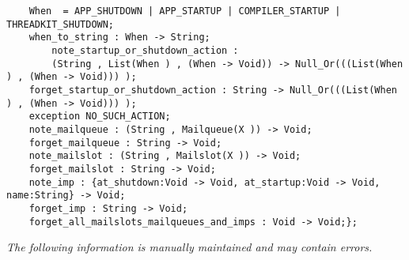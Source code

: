 \begin{verbatim}
    When  = APP_SHUTDOWN | APP_STARTUP | COMPILER_STARTUP | THREADKIT_SHUTDOWN;
    when_to_string : When -> String;
        note_startup_or_shutdown_action :
        (String , List(When ) , (When -> Void)) -> Null_Or(((List(When ) , (When -> Void))) );
    forget_startup_or_shutdown_action : String -> Null_Or(((List(When ) , (When -> Void))) );
    exception NO_SUCH_ACTION;
    note_mailqueue : (String , Mailqueue(X )) -> Void;
    forget_mailqueue : String -> Void;
    note_mailslot : (String , Mailslot(X )) -> Void;
    forget_mailslot : String -> Void;
    note_imp : {at_shutdown:Void -> Void, at_startup:Void -> Void, name:String} -> Void;
    forget_imp : String -> Void;
    forget_all_mailslots_mailqueues_and_imps : Void -> Void;};
\end{verbatim}
{\tiny\it The following information is manually maintained and may contain errors.}

